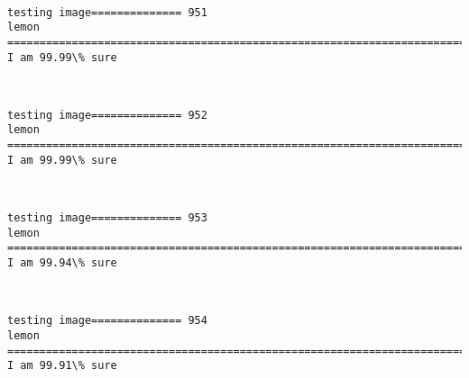 \documentclass[11pt]{article}
\begin{document}
    \begin{center}
    \end{center}
    { \hspace*{\fill} \\}
    
    \begin{Verbatim}[commandchars=\\\{\}]
testing image============== 951
lemon
============================================================================
I am 99.99\% sure

    \end{Verbatim}

    \begin{center}
    \end{center}
    { \hspace*{\fill} \\}
    
    \begin{Verbatim}[commandchars=\\\{\}]
testing image============== 952
lemon
============================================================================
I am 99.99\% sure

    \end{Verbatim}

    \begin{center}
    \end{center}
    { \hspace*{\fill} \\}
    
    \begin{Verbatim}[commandchars=\\\{\}]
testing image============== 953
lemon
============================================================================
I am 99.94\% sure

    \end{Verbatim}

    \begin{center}
    \end{center}
    { \hspace*{\fill} \\}
    
    \begin{Verbatim}[commandchars=\\\{\}]
testing image============== 954
lemon
============================================================================
I am 99.91\% sure

    \end{Verbatim}
\end{document}
